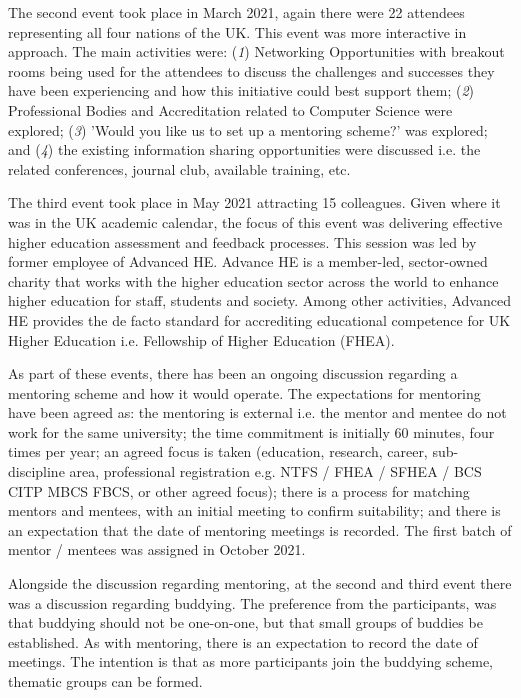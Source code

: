 \documentclass[sigconf]{acmart}
\begin{document}
The second event took place in March 2021, again there were 22
attendees representing all four nations of the UK. This event was more
interactive in approach. The main activities were: ({\emph{1}})
Networking Opportunities with breakout rooms being used for the
attendees to discuss the challenges and successes they have been
experiencing and how this initiative could best support them;
({\emph{2}}) Professional Bodies and Accreditation related to Computer
Science were explored; ({\emph{3}}) 'Would you like us to set up a
mentoring scheme?' was explored; and ({\emph{4}}) the existing
information sharing opportunities were discussed i.e. the related
conferences, journal club, available training, etc.

The third event took place in May 2021 attracting 15 colleagues. Given
where it was in the UK academic calendar, the focus of this event was
delivering effective higher education assessment and feedback
processes. This session was led by former employee of Advanced
HE. Advance HE is a member-led, sector-owned charity that works with
the higher education sector across the world to enhance higher
education for staff, students and society. Among other activities,
Advanced HE provides the de facto standard for accrediting educational
competence for UK Higher Education i.e. Fellowship of Higher Education
(FHEA).

As part of these events, there has been an ongoing discussion
regarding a mentoring scheme and how it would operate. The
expectations for mentoring have been agreed as: the mentoring is
external i.e. the mentor and mentee do not work for the same
university; the time commitment is initially 60 minutes, four times per
year; an agreed focus is taken (education, research, career,
sub-discipline area, professional registration e.g. NTFS / FHEA /
SFHEA / BCS CITP MBCS FBCS, or other agreed focus); there is a process
for matching mentors and mentees, with an initial meeting to confirm
suitability; and there is an expectation that the date of mentoring
meetings is recorded. The first batch of mentor / mentees was assigned
in October 2021.

Alongside the discussion regarding mentoring, at the second and third
event there was a discussion regarding buddying. The preference from
the participants, was that buddying should not be one-on-one, but that
small groups of buddies be established. As with mentoring, there is an
expectation to record the date of meetings. The intention is that as
more participants join the buddying scheme, thematic groups can be
formed.
\end{document}
